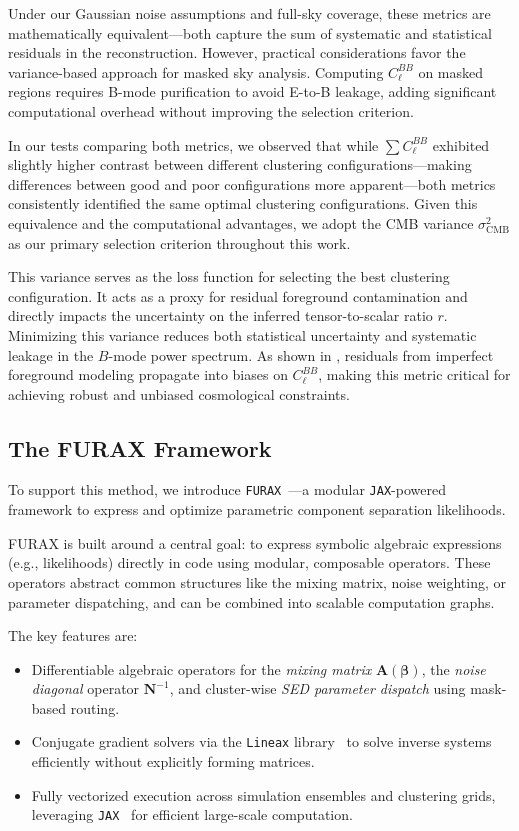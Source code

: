 \documentclass[fleqn,usenatbib]{mnras}
\begin{document}
Under our Gaussian noise assumptions and full-sky coverage, these metrics are mathematically equivalent—both capture the sum of systematic and statistical residuals in the reconstruction. However, practical considerations favor the variance-based approach for masked sky analysis. Computing $C_\ell^{BB}$ on masked regions requires B-mode purification to avoid E-to-B leakage, adding significant computational overhead without improving the selection criterion. 

In our tests comparing both metrics, we observed that while $\sum C_\ell^{BB}$ exhibited slightly higher contrast between different clustering configurations—making differences between good and poor configurations more apparent—both metrics consistently identified the same optimal clustering configurations. Given this equivalence and the computational advantages, we adopt the CMB variance $\sigma^2_{\mathrm{CMB}}$ as our primary selection criterion throughout this work.

This variance serves as the loss function for selecting the best clustering configuration. It acts as a proxy for residual foreground contamination and directly impacts the uncertainty on the inferred tensor-to-scalar ratio \( r \). Minimizing this variance reduces both statistical uncertainty and systematic leakage in the \( B \)-mode power spectrum. As shown in \citep{Errard2015}, residuals from imperfect foreground modeling propagate into biases on \( C_\ell^{BB} \), making this metric critical for achieving robust and unbiased cosmological constraints.
\subsection{The FURAX Framework}

To support this method, we introduce \texttt{FURAX}~\citep{FURAX}---a modular \texttt{JAX}-powered framework to express and optimize parametric component separation likelihoods.

FURAX is built around a central goal: to express symbolic algebraic expressions (e.g., likelihoods) directly in code using modular, composable operators. These operators abstract common structures like the mixing matrix, noise weighting, or parameter dispatching, and can be combined into scalable computation graphs.

The key features are:
\begin{itemize}
    \item Differentiable algebraic operators for the \textit{mixing matrix} \( \mathbf{A}(\boldsymbol{\beta}) \), the \textit{noise diagonal} operator \( \mathbf{N}^{-1} \), and cluster-wise \textit{SED parameter dispatch} using mask-based routing.
    \item Conjugate gradient solvers via the \texttt{Lineax} library~\citep{lineax} to solve inverse systems efficiently without explicitly forming matrices.
    \item Fully vectorized execution across simulation ensembles and clustering grids, leveraging \texttt{JAX}~\citep{JAX} for efficient large-scale computation.
\end{itemize}
\end{document}
